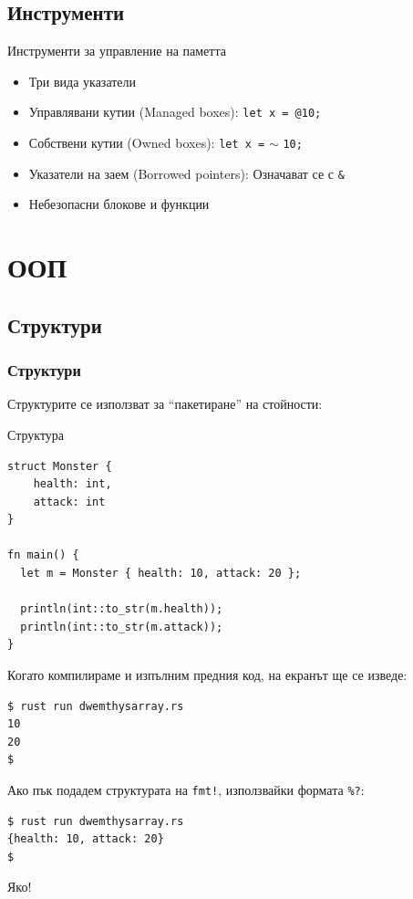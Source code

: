 \documentclass[xcolor=x11names,compress]{beamer}
\renewcommand{\(}{\begin{columns}}
\renewcommand{\)}{\end{columns}}
\newcommand{\<}[1]{\begin{column}{#1}}
\renewcommand{\>}{\end{column}}
\begin{document}
\subsection{Инструменти}
\begin{frame}{Инструменти за управление на паметта}
  \begin{itemize}[<+->]
  \item Три вида указатели
  \item Управлявани кутии (Managed boxes): \texttt{let x = @10;}
  \item Собствени кутии (Owned boxes): \texttt{let x =} $\sim$ \texttt{10;}
  \item Указатели на заем (Borrowed pointers): Означават се с \texttt{\&}
  \item Небезопасни блокове и функции
  \end{itemize}
\end{frame}


\section{\scshape ООП}
\subsection{Структури}
\begin{frame}[fragile]
  \frametitle{Структури}

  \pause
  Структурите се използват за "`пакетиране"' на стойности:

  \pause
  \begin{block}{Структура}
    \begin{lstlisting}
struct Monster {
    health: int,
    attack: int
}

fn main() {
  let m = Monster { health: 10, attack: 20 };

  println(int::to_str(m.health));
  println(int::to_str(m.attack));
}
    \end{lstlisting}
  \end{block}
\end{frame}

\begin{frame}[fragile]
  Когато компилираме и изпълним предния код, на екранът ще се изведе:

  \begin{lstlisting}
$ rust run dwemthysarray.rs
10
20
$
  \end{lstlisting}

  \pause
  Ако пък подадем структурата на \texttt{fmt!}, използвайки формата \texttt{\%?}:

  \pause
  \begin{lstlisting}
$ rust run dwemthysarray.rs
{health: 10, attack: 20}
$
  \end{lstlisting}

  \pause
  Яко!
\end{frame}
\end{document}

